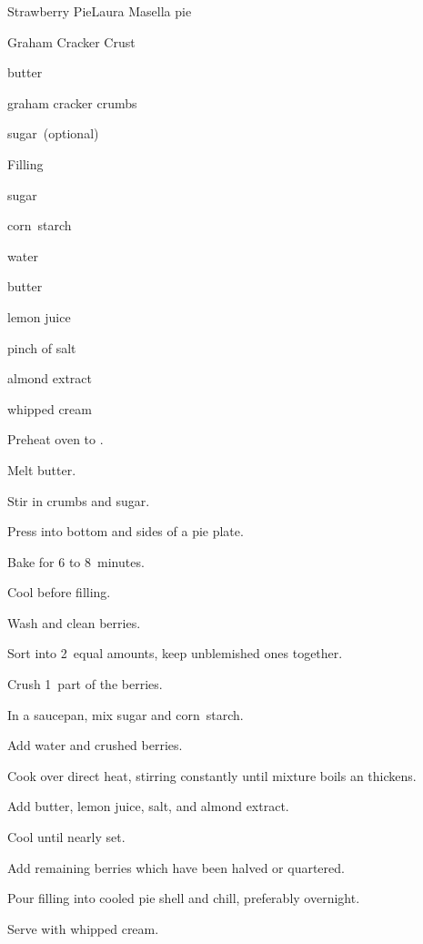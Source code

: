 \begin{recipe}{Strawberry Pie}{Laura Masella}{ pie}

Graham Cracker Crust
\begin{ingredients}
\item \C{\third} butter
\item \C{1\third} graham cracker crumbs
\item \C{\quarter} sugar~(optional)
\end{ingredients}

Filling
\begin{ingredients}
\item {} sugar
\item {} corn~starch
\item {} 
\item \C{\half} water
\item {} butter
\item {} lemon juice
\item pinch of salt
\item {} almond extract
\item whipped cream
\end{ingredients}

\begin{directions}
\item Preheat oven to .
\item Melt butter.
\item Stir in crumbs and sugar.
\item Press into bottom and sides of a  pie plate.
\item Bake for 6 to 8~minutes.
\item Cool before filling.
\item Wash and clean berries.
\item Sort into 2~equal amounts, keep unblemished ones together.
\item Crush 1~part of the berries.
\item In a saucepan, mix sugar and corn~starch.
\item Add water and crushed berries.
\item Cook over direct heat, stirring constantly until mixture boils an thickens.
\item Add butter, lemon juice, salt, and almond extract.
\item Cool until nearly set.
\item Add remaining berries which have been halved or quartered.
\item Pour filling into cooled pie shell and chill, preferably overnight.
\item Serve with whipped cream.
\end{directions}

\end{recipe}
